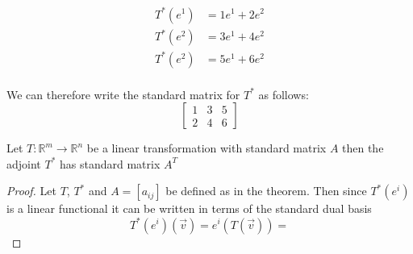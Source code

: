 \begin{example}
\begin{align*}
T^*(e^1)&=1e^1+2e^2\\
T^*(e^2)&=3e^1+4e^2\\
T^*(e^2)&=5e^1+6e^2\\
\end{align*}

We can therefore write the standard matrix for $T^*$ as follows:
\[
\begin{bmatrix}
1 & 3 & 5 \\
2 & 4 & 6 
\end{bmatrix}
\]
\end{example}

\begin{theorem}
Let $T:\mathbb{R}^m \to \mathbb{R}^n$ be a linear transformation with standard matrix $A$ then the adjoint $T^*$ has standard matrix $A^T$
\end{theorem}
\begin{proof}
Let $T$, $T^*$ and $A=[a_{ij}]$ be defined as in the theorem. Then since $T^*(e^i)$ is a linear functional it can be written in terms of the standard dual basis 
\[
T^*(e^i)(\vec{v})=e^i(T(\vec{v}))=
\]

\end{proof}
